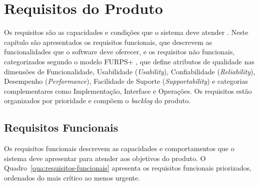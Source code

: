 \documentclass[
	12pt,				%
	openright,			%
	oneside,			    %
	a4paper,				%
	english,			%
	french,			%
	spanish,			%
	brazil			%
	]{abntex2}
\begin{document}
\chapter{Requisitos do Produto}

Os requisitos são as capacidades e condições que o sistema deve atender \cite{larman2007}. Neste capítulo são apresentados os requisitos funcionais, que descrevem as funcionalidades que o software deve oferecer, e os requisitos não funcionais, categorizados segundo o modelo FURPS+ \cite{grady1992}, que define atributos de qualidade nas dimensões de Funcionalidade, Usabilidade (\textit{Usability}), Confiabilidade (\textit{Reliability}), Desempenho (\textit{Performance}), Facilidade de Suporte (\textit{Supportability}) e categorias complementares como Implementação, Interface e Operações. Os requisitos estão organizados por prioridade e compõem o \textit{backlog} do produto.

\section{Requisitos Funcionais}

Os requisitos funcionais descrevem as capacidades e comportamentos que o sistema deve apresentar para atender aos objetivos do produto. O Quadro~\ref{qua:requisitos-funcionais} apresenta os requisitos funcionais priorizados, ordenados do mais crítico ao menos urgente.
\end{document}

